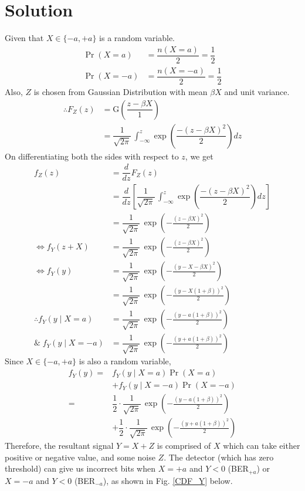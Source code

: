 \documentclass[journal,10pt,twocolumn]{IEEEtran}
\begin{document}
\section{Solution}
Given that $X \in \{ -a, +a\}$ is a random variable.
\begin{align}
\Pr(X=a) &= \dfrac{n(X=a)}{2} = \dfrac{1}{2}\\
\Pr(X=-a) &= \dfrac{n(X=-a)}{2} = \dfrac{1}{2}
\end{align}
Also, $Z$ is chosen from Gaussian Distribution with mean $\beta X$ and unit variance.
\begin{align}
\therefore F_Z(z) &= \text{G} \left( \dfrac{z - \beta X}{1} \right)\\
&= \dfrac{1}{\sqrt{2\pi}}\, \int_{-\infty} ^z \exp \left( \dfrac{-(z-\beta X)^2}{2} \right) dz
\end{align}
On differentiating both the sides with respect to $z$, we get
\begin{align}
f_Z(z) &= \dfrac{d}{dz}F_Z(z) \\
&= \dfrac{d}{dz} \left[ \dfrac{1}{\sqrt{2\pi}}\, \int_{-\infty} ^z \exp \left( \dfrac{-(z-\beta X)^2}{2} \right) dz \right] \\
 &= \dfrac{1}{\sqrt{2\pi}}\,\exp \left(-\frac{(z - \beta X)^2}{2} \right)  \\
\Leftrightarrow f_Y(z + X) &= \dfrac{1}{\sqrt{2\pi}}\,\exp \left(-\frac{(z - \beta X)^2}{2} \right)  \\
\Leftrightarrow f_Y(y) &= \dfrac{1}{\sqrt{2\pi}}\,\exp \left(-\frac{(y - X - \beta X)^2}{2} \right)  \\
&= \dfrac{1}{\sqrt{2\pi}}\,\exp \left(-\frac{(y - X(1 + \beta))^2}{2} \right) \\
\therefore f_Y(y \;|\; X = a) &= \dfrac{1}{\sqrt{2\pi}}\,\exp \left(-\frac{(y - a(1 + \beta))^2}{2} \right) \label{eqn 2.0.9} \\
\& \; f_Y(y \;|\; X = -a) &= \dfrac{1}{\sqrt{2\pi}}\,\exp \left(-\frac{(y + a(1 + \beta))^2}{2} \right) \label{eqn 2.0.10}
\end{align}
Since $X \in \{ -a, +a\}$ is also a random variable,
\begin{align}
f_Y(y) = &f_Y(y\;|\;X = a)\Pr(X=a) \nonumber \\
               &+ f_Y(y\;|\;X = -a)\Pr(X=-a)\\
 = &\dfrac{1}{2} \cdot \dfrac{1}{\sqrt{2\pi}}\,\exp \left(-\frac{(y - a(1 + \beta))^2}{2} \right) \nonumber \\
      &+ \dfrac{1}{2} \cdot \dfrac{1}{\sqrt{2\pi}}\,\exp \left(-\frac{(y + a(1 + \beta))^2}{2} \right)
\end{align}
Therefore, the resultant signal $Y = X+Z$ is comprised of $X$ which can take either positive or negative value, and some noise $Z$. The detector (which has zero threshold) can give us incorrect bits when $X = +a$ and $Y<0$ (BER$_{+a}$) or $X=-a$ and $Y<0$ (BER$_{-a}$), as shown in Fig. \ref{CDF_Y} below.
\end{document}
